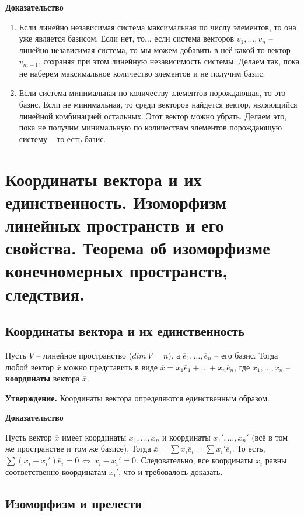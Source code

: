 \documentclass{article}
\begin{document}
\textbf{Доказательство}

\begin{enumerate}
    \item Если линейно независимая система максимальная по числу элементов, то она уже является базисом. Если нет, то... если система векторов $v_1,\ldots,v_n$ -- линейно независимая система, то мы можем добавить в неё какой-то вектор $v_{m+1}$, сохраняя при этом линейную независимость системы. Делаем так, пока не наберем максимальное количество элементов и не получим базис.
    \item Если система минимальная по количеству элементов порождающая, то это базис. Если не минимальная, то среди векторов найдется вектор, являющийся линейной комбинацией остальных. Этот вектор можно убрать. Делаем это, пока не получим минимальную по количествам элементов порождающую систему -- то есть базис.
\end{enumerate}

\newpage
\section{Координаты вектора и их единственность. Изоморфизм линейных пространств и его свойства. Теорема об изоморфизме конечномерных пространств, следствия.}
\subsection{Координаты вектора и их единственность}
Пусть $V$ -- линейное пространство ($dim\,V=n$), а $\overline{e}_1,\ldots,\overline{e}_n$ -- его базис. Тогда любой вектор $\overline{x}$ можно представить в виде $\overline{x}=x_1\overline{e}_1+\ldots+x_n\overline{e}_n$, где $x_1,\ldots,x_n$ -- \textbf{координаты} вектора $\overline{x}$.

\textbf{Утверждение.} Координаты вектора определяются единственным образом.

\textbf{Доказательство}

Пусть вектор $\overline{x}$ имеет координаты $x_1,\ldots,x_n$ и координаты $x_1',\ldots,x_n'$ (всё в том же пространстве и том же базисе). Тогда $\overline{x}=\sum x_i\overline{e}_i=\sum x_i'\overline{e}_i$. То есть, $\sum(x_i-x_i')\overline{e}_i=0\,\Leftrightarrow\,x_i-x_i'=0$. Следовательно, все координаты $x_i$ равны соответственно координатам $x_i'$, что и требовалось доказать.

\subsection{Изоморфизм и прелести}
\end{document}
